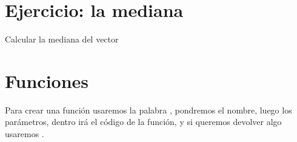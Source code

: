 \documentclass[letterpaper,10pt,spanish]{sphinxmanual}
\begin{document}
\section{Ejercicio: la mediana}
\label{\detokenize{tema4:ejercicio-la-mediana}}
Calcular la mediana del vector

\begin{sphinxVerbatim}[commandchars=\\\{\}]
          
     
     
     \PYG{o}{[}\PYG{o}{]}
     \PYG{o}{[}\PYG{o}{]}
     
  
     
     \PYG{o}{[}\PYG{o}{]}
     
\end{sphinxVerbatim}


\section{Funciones}
\label{\detokenize{tema4:funciones}}
Para crear una función usaremos la palabra , pondremos el nombre, luego los parámetros, dentro irá el código de la función, y si queremos devolver algo usaremos .
\end{document}
